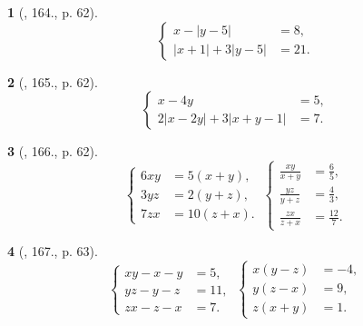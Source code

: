 \documentclass{article}
\newtheorem{baitoan}{}
\begin{document}
\begin{baitoan}[\cite{Tuyen_Toan_9_old}, 164., p. 62]
	\begin{equation*}
		\left\{\begin{split}
			x - |y - 5| &= 8,\\
			|x + 1| + 3|y - 5| &= 21.
		\end{split}\right.
	\end{equation*}
\end{baitoan}

\begin{baitoan}[\cite{Tuyen_Toan_9_old}, 165., p. 62]
	\begin{equation*}
		\left\{\begin{split}
			x - 4y &= 5,\\
			2|x - 2y| + 3|x + y - 1| &= 7.
		\end{split}\right.
	\end{equation*}
\end{baitoan}

\begin{baitoan}[\cite{Tuyen_Toan_9_old}, 166., p. 62]
	\begin{equation*}
		\left\{\begin{split}
			6xy &= 5(x + y),\\
			3yz &= 2(y + z),\\
			7zx &= 10(z + x).
		\end{split}\right.\ \left\{\begin{split}
		\frac{xy}{x + y} &= \frac{6}{5},\\
		\frac{yz}{y + z} &= \frac{4}{3},\\
		\frac{zx}{z + x} &= \frac{12}{7}.
		\end{split}\right.
	\end{equation*}
\end{baitoan}

\begin{baitoan}[\cite{Tuyen_Toan_9_old}, 167., p. 63]
	\begin{equation*}
		\left\{\begin{split}
			xy - x - y &= 5,\\
			yz - y - z &= 11,\\
			zx - z - x &= 7.
		\end{split}\right.\ \left\{\begin{split}
			x(y - z) &= -4,\\
			y(z - x) &= 9,\\
			z(x + y) &= 1.
		\end{split}\right.
	\end{equation*}
\end{baitoan}
\end{document}
